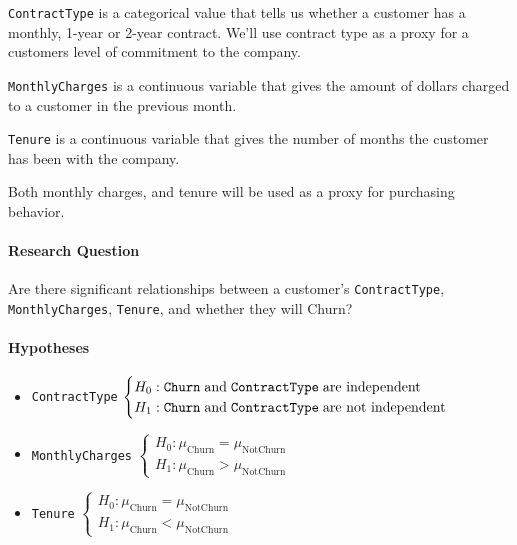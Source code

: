 \documentclass[man, floatsintext]{apa6}
\begin{document}
\texttt{ContractType} is a categorical value that tells us whether a customer has a monthly, 1-year or 2-year contract. We'll use contract type as a proxy for a customers level of commitment to the company.

\texttt{MonthlyCharges} is a continuous variable that gives the amount of dollars charged to a customer in the previous month.

\texttt{Tenure} is a continuous variable that gives the number of months the customer has been with the company.

Both monthly charges, and tenure will be used as a proxy for purchasing behavior.

\hspace{0.5mm}

\paragraph{Research Question}

Are there significant relationships between a customer's \texttt{ContractType}, \texttt{MonthlyCharges}, \texttt{Tenure}, and whether they will Churn?

\hspace{0.5mm}

\paragraph{Hypotheses}

\begin{itemize}
\item \texttt{ContractType} $\begin{cases}
H_0: \texttt{Churn} \hspace{1mm} \text{and}  \hspace{1mm} \texttt{ContractType} \hspace{1mm} \text{are independent} \\
H_1: \texttt{Churn} \hspace{1mm} \text{and} \hspace{1mm} \texttt{ContractType} \hspace{1mm} \text{are not independent}
\end{cases}$
\item \texttt{MonthlyCharges} $\begin{cases}
H_0: \mu_{\text{Churn}} = \mu_{\text{NotChurn}} \\
H_1: \mu_{\text{Churn}} > \mu_{\text{NotChurn}}
\end{cases}$
\item \texttt{Tenure} $\begin{cases}
H_0: \mu_{\text{Churn}} = \mu_{\text{NotChurn}} \\
H_1: \mu_{\text{Churn}} < \mu_{\text{NotChurn}}
\end{cases}$
\end{itemize}
\end{document}
